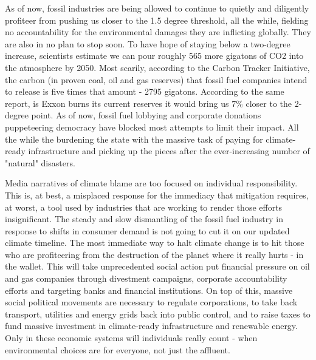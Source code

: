    As of now, fossil industries are being allowed to continue to quietly
   and diligently profiteer from pushing us closer to the 1.5 degree
   threshold, all the while, fielding no accountability for the
   environmental damages they are inflicting globally. They are also in no
   plan to stop soon. To have hope of staying below a two-degree increase,
   scientists estimate we can pour roughly 565 more gigatons of CO2 into
   the atmosphere by 2050. Most scarily, according to the Carbon Tracker
   Initiative, the carbon (in proven coal, oil and gas reserves) that
   fossil fuel companies intend to release is five times that amount -
   2795 gigatons. According to the same report, is Exxon burns its current
   reserves it would bring us 7\% closer to the 2-degree point. As of now,
   fossil fuel lobbying and corporate donations puppeteering democracy
   have blocked most attempts to limit their impact. All the while the
   burdening the state with the massive task of paying for climate-ready
   infrastructure and picking up the pieces after the ever-increasing
   number of "natural" disasters.

   Media narratives of climate blame are too focused on individual
   responsibility. This is, at best, a misplaced response for the
   immediacy that mitigation requires, at worst, a tool used by industries
   that are working to render those efforts insignificant. The steady and
   slow dismantling of the fossil fuel industry in response to shifts in
   consumer demand is not going to cut it on our updated climate timeline.
   The most immediate way to halt climate change is to hit those who are
   profiteering from the destruction of the planet where it really hurts -
   in the wallet. This will take unprecedented social action put financial
   pressure on oil and gas companies through divestment campaigns,
   corporate accountability efforts and targeting banks and financial
   institutions. On top of this, massive social political movements are
   necessary to regulate corporations, to take back transport, utilities
   and energy grids back into public control, and to raise taxes to fund
   massive investment in climate-ready infrastructure and renewable
   energy. Only in these economic systems will individuals really count -
   when environmental choices are for everyone, not just the affluent.

